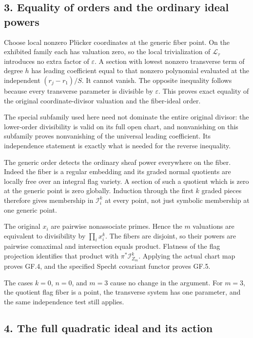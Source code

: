 \documentclass[
  10pt,
]{article}
\begin{document}
\subsection{3. Equality of orders and the ordinary ideal
powers}\label{equality-of-orders-and-the-ordinary-ideal-powers}

Choose local nonzero Plücker coordinates at the generic fiber point. On
the exhibited family each has valuation zero, so the local
trivialization of \(\mathcal L_\tau\) introduces no extra factor of
\(\varepsilon\). A section with lowest nonzero transverse term of degree
\(h\) has leading coefficient equal to that nonzero polynomial evaluated
at the independent \((r_j-r_1)/S\). It cannot vanish. The opposite
inequality follows because every transverse parameter is divisible by
\(\varepsilon\). This proves exact equality of the original
coordinate-divisor valuation and the fiber-ideal order.

The special subfamily used here need not dominate the entire original
divisor: the lower-order divisibility is valid on its full open chart,
and nonvanishing on this subfamily proves nonvanishing of the universal
leading coefficient. Its independence statement is exactly what is
needed for the reverse inequality.

The generic order detects the ordinary sheaf power everywhere on the
fiber. Indeed the fiber is a regular embedding and its graded normal
quotients are locally free over an integral flag variety. A section of
such a quotient which is zero at the generic point is zero globally.
Induction through the first \(k\) graded pieces therefore gives
membership in \(\mathcal I_i^k\) at every point, not just symbolic
membership at one generic point.

The original \(x_i\) are pairwise nonassociate primes. Hence the \(m\)
valuations are equivalent to divisibility by \(\prod_i x_i^k\). The
fibers are disjoint, so their powers are pairwise comaximal and
intersection equals product. Flatness of the flag projection identifies
that product with \(\pi^*\mathcal I_{Z_m}^k\). Applying the actual chart
map proves GF.4, and the specified Specht covariant functor proves GF.5.

The cases \(k=0\), \(n=0\), and \(m=3\) cause no change in the argument.
For \(m=3\), the quotient flag fiber is a point, the transverse system
has one parameter, and the same independence test still applies.

\subsection{4. The full quadratic ideal and its
action}\label{the-full-quadratic-ideal-and-its-action}
\end{document}
